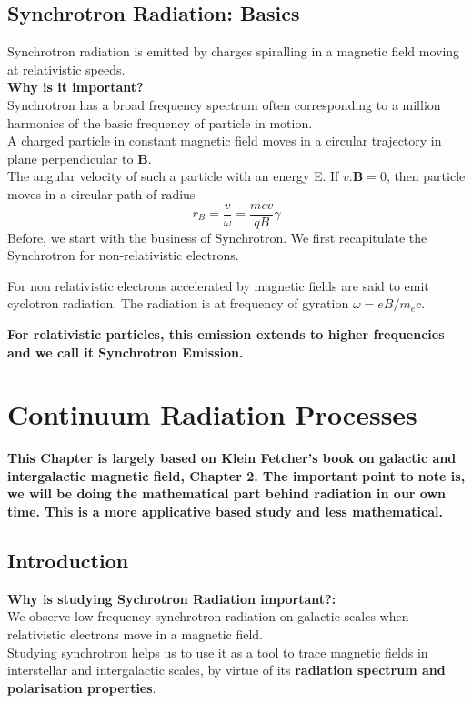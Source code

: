 \documentclass[12pt]{report}
\newcommand{\mbf}[1]{\mathbf{#1}}
\newcommand{\cbox}{tcolorbox}
\begin{document}
\section{Synchrotron Radiation: Basics}
Synchrotron radiation is emitted by charges spiralling in a magnetic field moving at relativistic speeds.\\
\textbf{Why is it important?}\\
Synchrotron has a broad frequency spectrum often corresponding to a million harmonics of the basic frequency of particle in motion.\\


A charged particle in constant magnetic field moves in a circular trajectory in plane perpendicular to $\mbf{B}$.\\
The angular velocity of such a particle with an energy E. If $v.\mbf{B}=0$, then particle moves in a circular path of radius
\begin{equation}
r_B=\frac{v}{\omega}=\frac{mcv}{qB}\gamma
\end{equation}
Before, we start with the business of Synchrotron. We first recapitulate the Synchrotron for non-relativistic electrons. \\

\begin{\cbox}
For non relativistic electrons accelerated by magnetic fields are said to emit cyclotron radiation. The radiation is at frequency of gyration $\omega=eB/m_ec$. 
\end{\cbox}
\textbf{For relativistic particles, this emission extends to higher frequencies and we call it Synchrotron Emission.}

\chapter{Continuum Radiation Processes}
\textbf{This Chapter is largely based on Klein Fetcher's book on galactic and intergalactic magnetic field, Chapter 2. The important point to note is, we will be doing the mathematical part behind radiation in our own time. This is a more applicative based study and less mathematical.}\\
\section{Introduction}
\textbf{Why is studying Sychrotron Radiation important?:}\\
We observe low frequency synchrotron radiation on galactic scales when relativistic electrons move in a magnetic field.\\ 
Studying synchrotron helps us to use it as a tool to trace magnetic fields in interstellar and intergalactic scales, by virtue of its \textbf{radiation spectrum and polarisation properties}.\\
\end{document}
